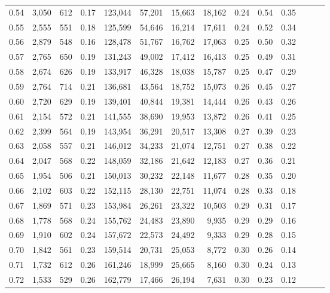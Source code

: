 \begin{tabular}{rrrrrrrrrrrrrr}
0.54 &  3,050 &  612 &  0.17 &  123,044 &   57,201 &  15,663 &  18,162 &  0.24 &  0.54 &      0.35 \\
0.55 &  2,555 &  551 &  0.18 &  125,599 &   54,646 &  16,214 &  17,611 &  0.24 &  0.52 &      0.34 \\
0.56 &  2,879 &  548 &  0.16 &  128,478 &   51,767 &  16,762 &  17,063 &  0.25 &  0.50 &      0.32 \\
0.57 &  2,765 &  650 &  0.19 &  131,243 &   49,002 &  17,412 &  16,413 &  0.25 &  0.49 &      0.31 \\
0.58 &  2,674 &  626 &  0.19 &  133,917 &   46,328 &  18,038 &  15,787 &  0.25 &  0.47 &      0.29 \\
0.59 &  2,764 &  714 &  0.21 &  136,681 &   43,564 &  18,752 &  15,073 &  0.26 &  0.45 &      0.27 \\
0.60 &  2,720 &  629 &  0.19 &  139,401 &   40,844 &  19,381 &  14,444 &  0.26 &  0.43 &      0.26 \\
0.61 &  2,154 &  572 &  0.21 &  141,555 &   38,690 &  19,953 &  13,872 &  0.26 &  0.41 &      0.25 \\
0.62 &  2,399 &  564 &  0.19 &  143,954 &   36,291 &  20,517 &  13,308 &  0.27 &  0.39 &      0.23 \\
0.63 &  2,058 &  557 &  0.21 &  146,012 &   34,233 &  21,074 &  12,751 &  0.27 &  0.38 &      0.22 \\
0.64 &  2,047 &  568 &  0.22 &  148,059 &   32,186 &  21,642 &  12,183 &  0.27 &  0.36 &      0.21 \\
0.65 &  1,954 &  506 &  0.21 &  150,013 &   30,232 &  22,148 &  11,677 &  0.28 &  0.35 &      0.20 \\
0.66 &  2,102 &  603 &  0.22 &  152,115 &   28,130 &  22,751 &  11,074 &  0.28 &  0.33 &      0.18 \\
0.67 &  1,869 &  571 &  0.23 &  153,984 &   26,261 &  23,322 &  10,503 &  0.29 &  0.31 &      0.17 \\
0.68 &  1,778 &  568 &  0.24 &  155,762 &   24,483 &  23,890 &   9,935 &  0.29 &  0.29 &      0.16 \\
0.69 &  1,910 &  602 &  0.24 &  157,672 &   22,573 &  24,492 &   9,333 &  0.29 &  0.28 &      0.15 \\
0.70 &  1,842 &  561 &  0.23 &  159,514 &   20,731 &  25,053 &   8,772 &  0.30 &  0.26 &      0.14 \\
0.71 &  1,732 &  612 &  0.26 &  161,246 &   18,999 &  25,665 &   8,160 &  0.30 &  0.24 &      0.13 \\
0.72 &  1,533 &  529 &  0.26 &  162,779 &   17,466 &  26,194 &   7,631 &  0.30 &  0.23 &      0.12 \\

\end{tabular}
